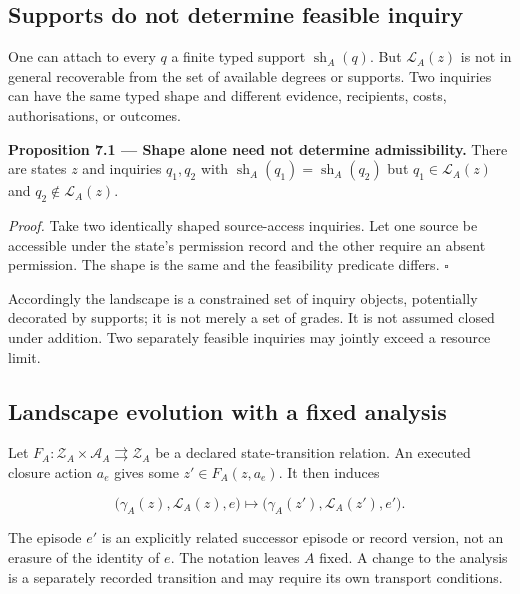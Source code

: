\documentclass[11pt,a4paper]{article}
\begin{document}
\subsection{Supports do not determine feasible
inquiry}\label{supports-do-not-determine-feasible-inquiry}

One can attach to every \(q\) a finite typed support
\(\operatorname{sh}_A(q)\). But \(\mathcal L_A(z)\) is not in general
recoverable from the set of available degrees or supports. Two inquiries
can have the same typed shape and different evidence, recipients, costs,
authorisations, or outcomes.


\textbf{Proposition 7.1 --- Shape alone need not determine
admissibility.} There are states \(z\) and inquiries \(q_1,q_2\) with
\(\operatorname{sh}_A(q_1)=\operatorname{sh}_A(q_2)\) but
\(q_1\in\mathcal L_A(z)\) and \(q_2\notin\mathcal L_A(z)\).

\emph{Proof.} Take two identically shaped source-access inquiries. Let
one source be accessible under the state's permission record and the
other require an absent permission. The shape is the same and the
feasibility predicate differs. \(\square\)

Accordingly the landscape is a constrained set of inquiry objects,
potentially decorated by supports; it is not merely a set of grades. It
is not assumed closed under addition. Two separately feasible inquiries
may jointly exceed a resource limit.

\subsection{Landscape evolution with a fixed
analysis}\label{landscape-evolution-with-a-fixed-analysis}

Let \(F_A:\mathscr Z_A\times\mathscr A_A\rightrightarrows\mathscr Z_A\)
be a declared state-transition relation. An executed closure action
\(a_e\) gives some \(z'\in F_A(z,a_e)\). It then induces

\nopagebreak[4]

\[
\bigl(\gamma_A(z),\mathcal L_A(z),e\bigr)
\longmapsto
\bigl(\gamma_A(z'),\mathcal L_A(z'),e'\bigr).
\]

The episode \(e'\) is an explicitly related successor episode or record
version, not an erasure of the identity of \(e\). The notation leaves
\(A\) fixed. A change to the analysis is a separately recorded
transition and may require its own transport conditions.
\end{document}
